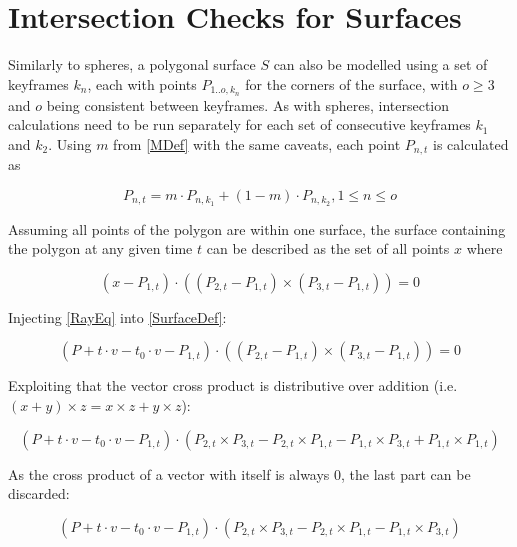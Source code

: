 \section{Intersection Checks for Surfaces}

Similarly to spheres, a polygonal surface \(S\) can also be modelled using a set of keyframes \(k_n\),
each with points \(P_{1..o, k_n}\) for the corners of the surface, with \(o \ge 3\) and \(o\) being consistent between keyframes.
As with spheres, intersection calculations need to be run separately for each set of consecutive keyframes \(k_1\) and \(k_2\).
\newline
Using \(m\) from \eqref{MDef} with the same caveats, each point \(P_{n, t}\) is calculated as

\begin{equation}\label{SurfacePointDef}
    P_{n, t} = m \cdot P_{n, k_1} + (1 - m) \cdot P_{n, k_2}, 1 \le n \le o
\end{equation}

Assuming all points of the polygon are within one surface,
the surface containing the polygon at any given time \(t\) can be described as the set of all points \(x\) where

\begin{equation}\label{SurfaceDef}
    (x - P_{1, t}) \cdot ((P_{2, t} - P_{1, t}) \times (P_{3, t} - P_{1, t})) = 0
\end{equation}

Injecting \eqref{RayEq} into \eqref{SurfaceDef}:

\begin{equation}
    (P + t \cdot v - t_0 \cdot v - P_{1, t}) \cdot ((P_{2, t} - P_{1, t}) \times (P_{3, t} - P_{1, t})) = 0
\end{equation}

Exploiting that the vector cross product is distributive over addition (i.e. \( (x + y) \times z = x \times z + y \times z\)):

\begin{equation*}
    (P + t \cdot v - t_0 \cdot v - P_{1, t}) \cdot
    (P_{2, t} \times P_{3, t} - P_{2, t} \times P_{1, t} - P_{1, t} \times P_{3, t} + P_{1, t} \times P_{1, t})
\end{equation*}

As the cross product of a vector with itself is always 0, the last part can be discarded:

\begin{equation}\label{SurfaceBeforeCross}
    (P + t \cdot v - t_0 \cdot v - P_{1, t}) \cdot
    (P_{2, t} \times P_{3, t} - P_{2, t} \times P_{1, t} - P_{1, t} \times P_{3, t})
\end{equation}


